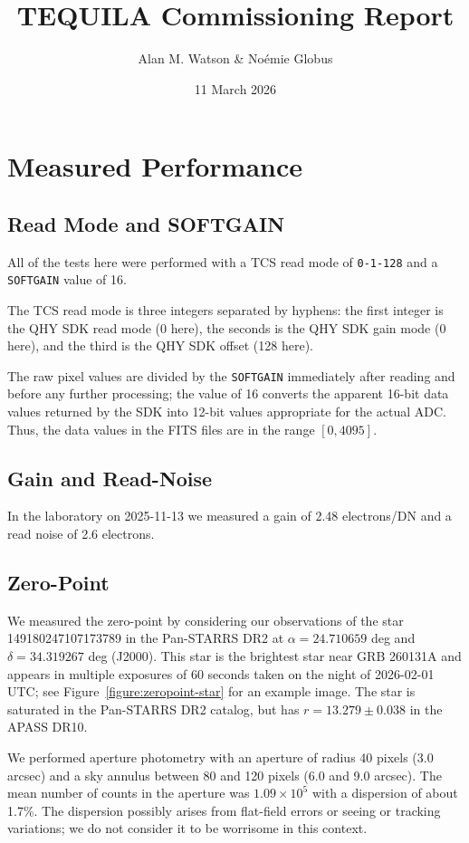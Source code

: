 \documentclass[10pt]{article}
\title{TEQUILA Commissioning Report}
\author{Alan M. Watson \& Noémie Globus}
\date{11 March 2026}
\begin{document}
\maketitle

\section{Measured Performance}

\subsection{Read Mode and SOFTGAIN}

All of the tests here were performed with a TCS read mode of \verb|0-1-128| and a \verb|SOFTGAIN| value of 16. 

The TCS read mode is three integers separated by hyphens: the first integer is the QHY SDK read mode (0 here), the seconds is the QHY SDK gain mode (0 here), and the third is the QHY SDK offset (128 here).

The raw pixel values are divided by the \verb|SOFTGAIN| immediately after reading and before any further processing; the value of 16 converts the apparent 16-bit data values returned by the SDK into 12-bit values appropriate for the actual ADC. Thus, the data values in the FITS files are in the range $[0,4095]$.

\subsection{Gain and Read-Noise}

In the laboratory on 2025-11-13 we measured a gain of 2.48 electrons/DN and a read noise of 2.6 electrons.

\subsection{Zero-Point}

We measured the zero-point by considering our observations of the star 149180247107173789 in the Pan-STARRS DR2 at $\alpha = 24.710659$ deg and $\delta = 34.319267$ deg (J2000). This star is the brightest star near GRB 260131A and appears in multiple exposures of 60 seconds taken on the night of 2026-02-01 UTC; see Figure~\ref{figure:zeropoint-star} for an example image. The star is saturated in the Pan-STARRS DR2 catalog, but has $r = 13.279 \pm 0.038$ in the APASS DR10.

We performed aperture photometry with an aperture of radius 40 pixels (3.0 arcsec) and a sky annulus between 80 and 120 pixels (6.0 and 9.0 arcsec). The mean number of counts in the aperture was $1.09\times 10^5$ with a dispersion of about 1.7\%. The dispersion possibly arises from flat-field errors or seeing or tracking variations; we do not consider it to be worrisome in this context.
\end{document}
